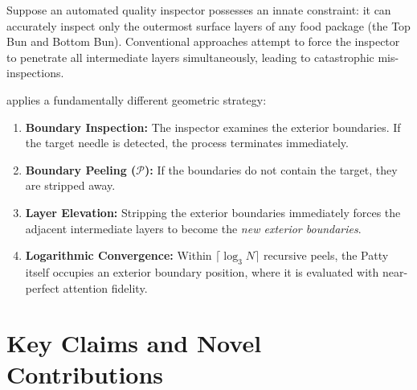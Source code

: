 Suppose an automated quality inspector possesses an innate constraint: it can accurately inspect only the outermost surface layers of any food package (the Top Bun and Bottom Bun). Conventional approaches attempt to force the inspector to penetrate all intermediate layers simultaneously, leading to catastrophic mis-inspections.

\RBER{} applies a fundamentally different geometric strategy:
\begin{enumerate}
    \item \textbf{Boundary Inspection:} The inspector examines the exterior boundaries. If the target needle is detected, the process terminates immediately.
    \item \textbf{Boundary Peeling ($\mathcal{P}$):} If the boundaries do not contain the target, they are stripped away.
    \item \textbf{Layer Elevation:} Stripping the exterior boundaries immediately forces the adjacent intermediate layers to become the \emph{new exterior boundaries}.
    \item \textbf{Logarithmic Convergence:} Within $\lceil \log_3 N \rceil$ recursive peels, the Patty itself occupies an exterior boundary position, where it is evaluated with near-perfect attention fidelity.
\end{enumerate}

\section{Key Claims and Novel Contributions}
\label{sec:contributions}

